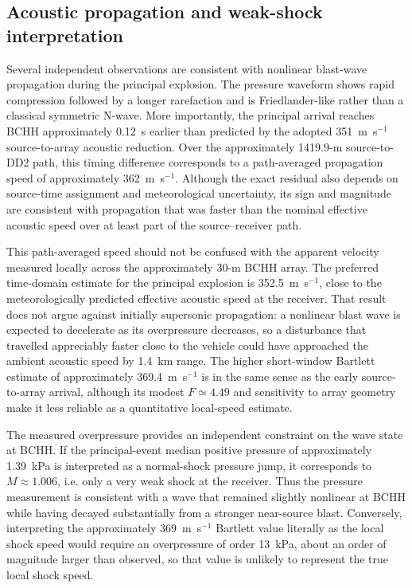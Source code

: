 \documentclass[]{seismica}
\begin{document}
\subsection{Acoustic propagation and weak-shock interpretation}

Several independent observations are consistent with nonlinear blast-wave
propagation during the principal explosion. The pressure waveform shows rapid
compression followed by a longer rarefaction and is Friedlander-like rather
than a classical symmetric N-wave. More importantly, the principal arrival
reaches BCHH approximately 0.12~s earlier than predicted by the adopted
351~m~s$^{-1}$ source-to-array acoustic reduction. Over the approximately
1419.9-m source-to-DD2 path, this timing difference corresponds to a
path-averaged propagation speed of approximately 362~m~s$^{-1}$. Although
the exact residual also depends on source-time assignment and meteorological
uncertainty, its sign and magnitude are consistent with propagation that was
faster than the nominal effective acoustic speed over at least part of the
source--receiver path.

This path-averaged speed should not be confused with the apparent velocity
measured locally across the approximately 30-m BCHH array. The preferred
time-domain estimate for the principal explosion is 352.5~m~s$^{-1}$, close
to the meteorologically predicted effective acoustic speed at the receiver.
That result does not argue against initially supersonic propagation: a
nonlinear blast wave is expected to decelerate as its overpressure decreases,
so a disturbance that travelled appreciably faster close to the vehicle could
have approached the ambient acoustic speed by 1.4~km range. The higher
short-window Bartlett estimate of approximately 369.4~m~s$^{-1}$ is in the
same sense as the early source-to-array arrival, although its modest
$F\simeq4.49$ and sensitivity to array geometry make it less reliable as a
quantitative local-speed estimate.

The measured overpressure provides an independent constraint on the wave state
at BCHH. If the principal-event median positive pressure of approximately
1.39~kPa is interpreted as a normal-shock pressure jump, it corresponds to
$M\approx1.006$, i.e. only a very weak shock at the receiver. Thus the
pressure measurement is consistent with a wave that remained slightly
nonlinear at BCHH while having decayed substantially from a stronger
near-source blast. Conversely, interpreting the approximately
369~m~s$^{-1}$ Bartlett value literally as the local shock speed would require
an overpressure of order 13~kPa, about an order of magnitude larger than
observed, so that value is unlikely to represent the true local shock speed.
\end{document}
